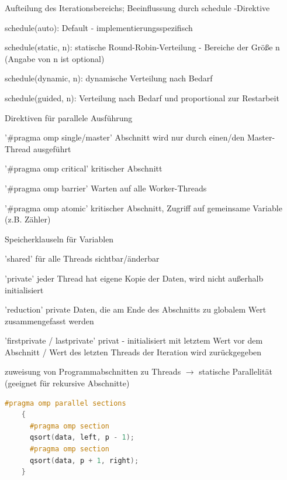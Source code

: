 \documentclass[10pt]{article}
\begin{document}
\begin{itemize*}
  \item Aufteilung des Iterationsbereichs; Beeinflussung durch schedule -Direktive
  \begin{itemize*}
    \item schedule(auto): Default - implementierungsspezifisch
    \item schedule(static, n): statische Round-Robin-Verteilung - Bereiche der Größe n (Angabe von n ist optional)
    \item schedule(dynamic, n): dynamische Verteilung nach Bedarf
    \item schedule(guided, n): Verteilung nach Bedarf und proportional zur Restarbeit
  \end{itemize*}
  \item Direktiven für parallele Ausführung
  \begin{itemize*}
    \item '\#pragma omp single/master' Abschnitt wird nur durch einen/den Master-Thread ausgeführt
    \item '\#pragma omp critical' kritischer Abschnitt
    \item '\#pragma omp barrier' Warten auf alle Worker-Threads
    \item '\#pragma omp atomic' kritischer Abschnitt, Zugriff auf gemeinsame Variable (z.B. Zähler)
  \end{itemize*}
  \item Speicherklauseln für Variablen
  \begin{itemize*}
    \item 'shared' für alle Threads sichtbar/änderbar
    \item 'private' jeder Thread hat eigene Kopie der Daten, wird nicht außerhalb initialisiert
    \item 'reduction' private Daten, die am Ende des Abschnitts zu globalem Wert zusammengefasst werden
    \item 'firstprivate / lastprivate' privat - initialisiert mit letztem Wert vor dem Abschnitt / Wert des letzten Threads der Iteration wird zurückgegeben
  \end{itemize*}
  \item zuweisung von Programmabschnitten zu Threads $\rightarrow$ statische Parallelität (geeignet für rekursive Abschnitte)
  \begin{lstlisting}[language=C++]
    #pragma omp parallel sections
    {
      #pragma omp section
      qsort(data, left, p - 1);
      #pragma omp section
      qsort(data, p + 1, right);
    }
    \end{lstlisting}

\end{itemize*}
\end{document}

